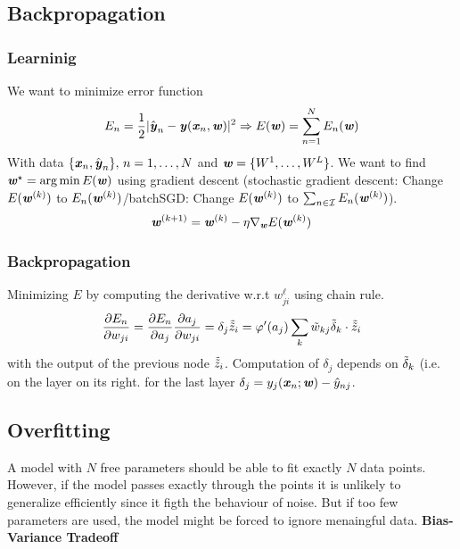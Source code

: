 \subsection{Backpropagation}
    \subsubsection{Learninig}
        We want to minimize error function 
        \begin{equation*}
            E_n = \frac{1}{2}|\hat{\textbf{\textit{y}}}_n - \textbf{\textit{y}}(\textbf{\textit{x}}_n,\textbf{\textit{w}})|^2 \Rightarrow
            E(\textbf{\textit{w}}) = \sum_{n=1}^N E_n(\textbf{\textit{w}})
        \end{equation*}
        With data $\{\textbf{\textit{x}}_n, \hat{\textbf{\textit{y}}}_n\}, \, n = 1,\dots,N$ and $\textbf{\textit{w}} = \{W^1,\dots,W^L\}$. We want to find $\textbf{\textit{w}}^\star=\arg\min E(\textbf{\textit{w}})$ using gradient descent \Big(stochastic gradient descent: Change $E(\textbf{\textit{w}}^{(k)})$ to $E_n(\textbf{\textit{w}}^{(k)})$/batchSGD: Change $E(\textbf{\textit{w}}^{(k)})$ to $\sum_{n\in\mathcal{I}}E_n(\textbf{\textit{w}}^{(k)})$\Big).
        \begin{equation*}
            \textbf{\textit{w}}^{(k+1)} =\textbf{\textit{w}}^{(k)} - \eta\nabla_{\textbf{\textit{w}}}E(\textbf{\textit{w}}^{(k)})
        \end{equation*}
        
    \subsubsection{Backpropagation}
        Minimizing $E$ by computing the derivative w.r.t $w_{ji}^\ell$ using chain rule.
        \begin{equation*}
            \frac{\partial E_n}{\partial w_{ji}}= \frac{\partial E_n}{\partial a_j}\frac{\partial a_j}{\partial w_{ji}} = \delta_j \Tilde{\Tilde{z}}_i = \varphi'(a_j)\sum_k \Tilde{w}_{kj}\Tilde{\delta}_k \cdot \Tilde{\Tilde{z}}_i
        \end{equation*}
        with the output of the previous node $\Tilde{\Tilde{z}}_i$. Computation of $\delta_j$ depends on $\Tilde{\delta}_k$ (i.e. on the layer on its right. for the last layer $\delta_j = y_j(\textbf{\textit{x}}_n; \textbf{\textit{w}}) - \hat{y}_{nj}$.
    
\subsection{Overfitting}
    A model with $N$ free parameters should be able to fit exactly $N$ data points. However, if the model passes exactly through the points it is unlikely to generalize efficiently since it figth the behaviour of noise. But if too few parameters are used, the model might be forced to ignore menaingful data. \textbf{Bias-Variance Tradeoff}